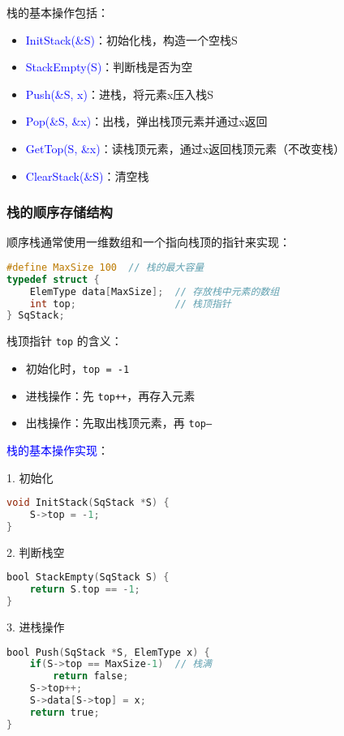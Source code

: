 \documentclass{../../note}
\begin{document}
栈的基本操作包括：

\begin{itemize}
  \item \textcolor{blue}{InitStack(\&S)}：初始化栈，构造一个空栈S
  \item \textcolor{blue}{StackEmpty(S)}：判断栈是否为空
  \item \textcolor{blue}{Push(\&S, x)}：进栈，将元素x压入栈S
  \item \textcolor{blue}{Pop(\&S, \&x)}：出栈，弹出栈顶元素并通过x返回
  \item \textcolor{blue}{GetTop(S, \&x)}：读栈顶元素，通过x返回栈顶元素（不改变栈）
  \item \textcolor{blue}{ClearStack(\&S)}：清空栈
\end{itemize}

\subsubsection{栈的顺序存储结构}

顺序栈通常使用一维数组和一个指向栈顶的指针来实现：

\begin{lstlisting}[language=C]
#define MaxSize 100  // 栈的最大容量
typedef struct {
    ElemType data[MaxSize];  // 存放栈中元素的数组
    int top;                 // 栈顶指针
} SqStack;
\end{lstlisting}

栈顶指针 \texttt{top} 的含义：
\begin{itemize}
  \item 初始化时，\texttt{top = -1}
  \item 进栈操作：先 \texttt{top++}，再存入元素
  \item 出栈操作：先取出栈顶元素，再 \texttt{top--}
\end{itemize}

\textcolor{blue}{栈的基本操作实现}：

1. 初始化
\begin{lstlisting}[language=C]
void InitStack(SqStack *S) {
    S->top = -1;
}
\end{lstlisting}

2. 判断栈空
\begin{lstlisting}[language=C]
bool StackEmpty(SqStack S) {
    return S.top == -1;
}
\end{lstlisting}

3. 进栈操作
\begin{lstlisting}[language=C]
bool Push(SqStack *S, ElemType x) {
    if(S->top == MaxSize-1)  // 栈满
        return false;
    S->top++;
    S->data[S->top] = x;
    return true;
}
\end{lstlisting}
\end{document}
